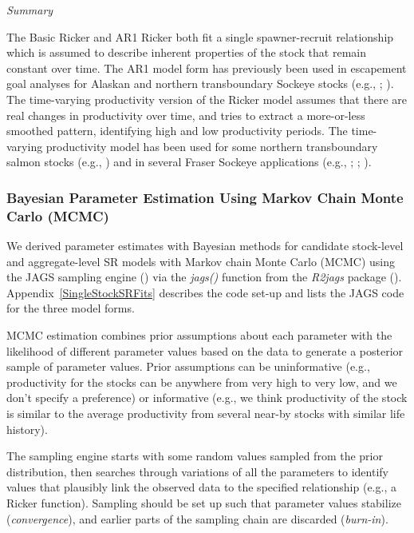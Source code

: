 \documentclass[french,11pt]{book}
\begin{document}
\emph{Summary}

The Basic Ricker and AR1 Ricker both fit a single spawner-recruit relationship which is assumed to describe inherent properties of the stock that remain constant over time. The AR1 model form has previously been used in escapement goal analyses for Alaskan and northern transboundary Sockeye stocks (e.g., ; ). The time-varying productivity version of the Ricker model assumes that there are real changes in productivity over time, and tries to extract a more-or-less smoothed pattern, identifying high and low productivity periods. The time-varying productivity model has been used for some northern transboundary salmon stocks (e.g., ) and in several Fraser Sockeye applications (e.g., ; ; ).

\subsubsection{Bayesian Parameter Estimation Using Markov Chain Monte Carlo (MCMC)}\label{bayesian-parameter-estimation-using-markov-chain-monte-carlo-mcmc}

We derived parameter estimates with Bayesian methods for candidate stock-level and aggregate-level SR models with Markov chain Monte Carlo (MCMC) using the JAGS sampling engine () via the \emph{jags()} function from the \emph{R2jags} package (). Appendix~\ref{SingleStockSRFits} describes the code set-up and lists the JAGS code for the three model forms.

MCMC estimation combines prior assumptions about each parameter with the likelihood of different parameter values based on the data to generate a posterior sample of parameter values. Prior assumptions can be uninformative (e.g., productivity for the stocks can be anywhere from very high to very low, and we don't specify a preference) or informative (e.g., we think productivity of the stock is similar to the average productivity from several near-by stocks with similar life history).

The sampling engine starts with some random values sampled from the prior distribution, then searches through variations of all the parameters to identify values that plausibly link the observed data to the specified relationship (e.g., a Ricker function). Sampling should be set up such that parameter values stabilize (\emph{convergence}), and earlier parts of the sampling chain are discarded (\emph{burn-in}).
\end{document}

